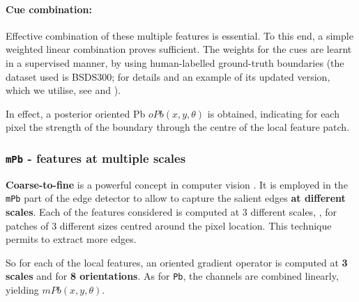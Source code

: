 \paragraph{Cue combination:} Effective combination of these multiple features %
is essential. To this end, a simple weighted linear combination proves sufficient. The weights for the %
cues are learnt in a supervised manner, by %
using human-labelled ground-truth boundaries (the dataset used is BSDS300; for details and an example of its updated version, which we utilise, see  and ). 

In effect, a posterior oriented Pb $oPb(x,y,\theta)$ is obtained, indicating for each pixel the strength of the boundary through the centre of the local feature patch.

\subsubsection{{\tt mPb} - features at multiple scales}
\label{sec:ch3-mPb}

{\bf Coarse-to-fine} is a powerful concept in computer vision \cite{Ren2008multi}. It is employed in the {\tt mPb} part of the edge detector to allow to capture the salient edges {\bf at different scales}. Each of the features considered is computed at 3 different scales, \ie, for patches of 3 different sizes centred around the pixel location. This technique permits %
to extract more edges.

So for each of the local features, an oriented gradient operator is computed at {\bf 3 scales} and for {\bf 8 orientations}. As for {\tt Pb}, the channels are combined linearly, yielding $mPb(x,y,\theta)$.


